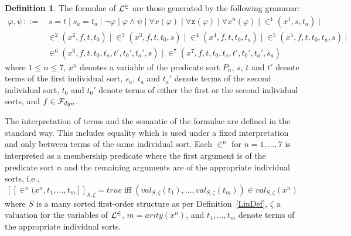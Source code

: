 \documentclass[preprint,11pt]{elsarticle}
\theoremstyle{definition}
\newtheorem{definition}{Definition}[section]
\theoremstyle{remark}
\begin{document}
\begin{definition}
 The formulae of ${\cal L}^\in$ are those generated by the following grammar:
\begin{align*}
\varphi, \psi \, ::= & \, s=t \mid s_a = t_a \mid  \neg\varphi \mid \varphi \wedge \psi \mid \forall x (\varphi) \mid \forall \texttt{x} (\varphi) \mid \forall x^n (\varphi) \mid \in^1\!\!(x^1\!,s,t_a) \mid\\
&\in^2\!\!(x^2\!,f,t,t_0) \mid \in^3\!\!(x^3\!,f,t,t_0,s) \mid \in^4\!\!(x^4\!,f,t,t_0,t_a) \mid \in^5\!\!(x^5\!,f,t,t_0,t_a,s) \mid \\
&\in^6\!\!(x^6\!, f,t,t_0,t_a, t',t_0',t_a',s ) \mid \in^7\!\!(x^7\!,f,t,t_0,t_a, t',t_0',t_a',s_a )
\end{align*}
where $1 \leq n \leq 7$, $x^n$ denotes a variable of the predicate sort $P_n$, $s$, $t$ and $t'$ denote terms of the first individual sort, $s_a$, $t_a$ and $t_a'$ denote terms of the second individual sort, $t_0$ and $t_0'$ denote terms of either the first or the second individual sorts, and $f \in {\cal F}_{dyn}$.

The interpretation of terms and the semantic of the formulae are defined in the standard way. This includes equality which is used under a fixed interpretation and only between terms of the same individual sort. Each $\in^n$ for $n = 1, \ldots, 7$ is interpreted as a membership predicate where the first argument is of the predicate sort $n$ and the remaining arguments are of the appropriate individual sorts, i.e.,
\[[\![\in^n\!\!(x^n,t_1,\ldots,t_m]\!]_{S,\zeta}=\mathit{true} \; \text{iff} \; (\mathit{val}_{S,\zeta}(t_1), \ldots, \mathit{val}_{S,\zeta}(t_m)) \in \mathit{val}_{S,\zeta}(x^n)\]
where $S$ is a many sorted first-order structure as per Definition~\ref{LinDef}, $\zeta$ a valuation for the variables of ${\cal L}^\in$, $m = \mathit{arity}(x^n)$, and $t_1, \ldots, t_m$ denote terms of the appropriate individual sorts.
\end{definition}
\end{document}

